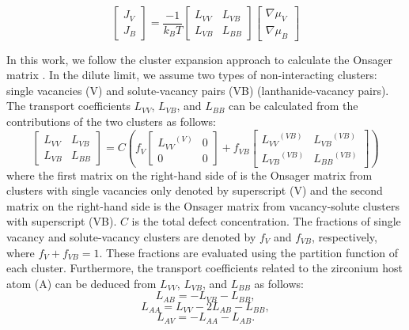 \documentclass[preprint,12pt]{elsarticle}
\begin{document}
\begin{equation}
\label{matrix_form_onsager}
    \begin{bmatrix}
        J_V \\
        J_B 
    \end{bmatrix}=\frac{-1}{k_B T}
    \begin{bmatrix}
    L_{VV} & L_{VB} \\
    L_{VB} & L_{BB}
    \end{bmatrix}
        \begin{bmatrix}
        \nabla\mu_V \\
        \nabla\mu_B
    \end{bmatrix}
\end{equation}


In this work, we follow the cluster expansion approach to calculate the Onsager matrix \cite{sanchez_generalized_1984, schuler_kineclue_2020}. In the dilute limit, we assume two types of non-interacting clusters: single vacancies (V) and solute-vacancy pairs (VB) (lanthanide-vacancy pairs). The transport coefficients $L_{VV}$, $L_{VB}$, and $L_{BB}$ can be calculated from the contributions of the two clusters as follows:
\begin{equation}
\label{eq_cluster_exp}
    \begin{bmatrix}
    L_{VV} & L_{VB} \\
    L_{VB} & L_{BB}
    \end{bmatrix}
    =
    C (
    f_V 
    \begin{bmatrix}
    {L_{VV}}^{(V)} & 0 \\
    0 & 0 
    \end{bmatrix}
    + f_{VB}
    \begin{bmatrix}
    {L_{VV}}^{(VB)} & {L_{VB}}^{(VB)} \\
    {L_{VB}}^{(VB)} & {L_{BB}}^{(VB)}
    \end{bmatrix}
    )
\end{equation}
where the first matrix on the right-hand side of  is the Onsager matrix from clusters with single vacancies only denoted by superscript (V) and the second matrix on the right-hand side is the Onsager matrix from vacancy-solute clusters with superscript (VB). $C$ is the total defect concentration. The fractions of single vacancy and solute-vacancy clusters are denoted by $f_V$ and $f_{VB}$, respectively, where $f_V + f_{VB} = 1$. These fractions are evaluated using the partition function of each cluster. Furthermore, the transport coefficients related to the zirconium host atom (A) can be deduced from $L_{VV}$, $L_{VB}$, and $L_{BB}$ as follows:
\begin{equation}
    L_{AB} = -L_{VB} - L_{BB},
\end{equation}
\begin{equation}
    L_{AA} = L_{VV} - 2L_{AB} - L_{BB},
\end{equation}
\begin{equation}
    L_{AV} = -L_{AA} - L_{AB}.
\end{equation}
\end{document}
